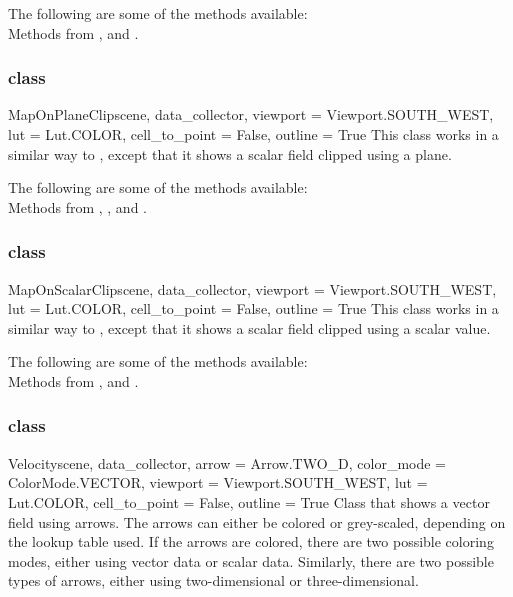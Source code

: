 The following are some of the methods available:\\
Methods from \ActorThreeD, \Transform and \DataSetMapper.

\subsubsection{\MapOnPlaneClip class}

\begin{classdesc}{MapOnPlaneClip}{scene, data_collector,
viewport = Viewport.SOUTH_WEST, lut = Lut.COLOR, cell_to_point = False, 
outline = True}
This class works in a similar way to \MapOnPlaneCut, except that it shows a 
scalar field clipped using a plane. 
\end{classdesc}

The following are some of the methods available:\\
Methods from \ActorThreeD, \Transform, \Clipper and \DataSetMapper.

\subsubsection{\MapOnScalarClip class}

\begin{classdesc}{MapOnScalarClip}{scene, data_collector, 
viewport = Viewport.SOUTH_WEST, lut = Lut.COLOR, cell_to_point = False, 
outline = True}
This class works in a similar way to \Map, except that it shows a scalar 
field clipped using a scalar value. 
\end{classdesc}

The following are some of the methods available:\\
Methods from \ActorThreeD, \Clipper and \DataSetMapper.

\subsubsection{\Velocity class}

\begin{classdesc}{Velocity}{scene, data_collector, arrow = Arrow.TWO_D, 
color_mode = ColorMode.VECTOR, viewport = Viewport.SOUTH_WEST,  
lut = Lut.COLOR, cell_to_point = False, outline = True}
Class that shows a vector field using arrows. The arrows can either be 
colored or grey-scaled, depending on the lookup table used. If the arrows 
are colored, there are two possible coloring modes, either using vector data or 
scalar data. Similarly, there are two possible types of arrows, either 
using two-dimensional or three-dimensional.
\end{classdesc}

